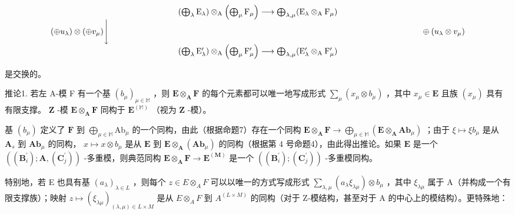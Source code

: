 \[
\begin{array}{c} \left(\bigoplus_ {\lambda} \mathrm{E} _ {\lambda}\right) \otimes_ {\mathrm{A}} \left(\bigoplus_ {\mu} \mathrm{F} _ {\mu}\right) \longrightarrow \bigoplus_ {\lambda , \mu} (\mathrm{E} _ {\lambda} \otimes_ {\mathrm{A}} \mathrm{F} _ {\mu}) \\ (\oplus u _ {\lambda}) \otimes (\oplus v _ {\mu}) \Bigg \downarrow \qquad \qquad \qquad \qquad \qquad \qquad \qquad \qquad \qquad \qquad \qquad \qquad \qquad \qquad \qquad \qquad \qquad \qquad \qquad \oplus (u _ {\lambda} \otimes v _ {\mu}) \\ \left(\bigoplus_ {\lambda} \mathrm{E} _ {\lambda} ^ {\prime}\right) \otimes_ {\mathrm{A}} \left(\bigoplus_ {\mu} \mathrm{F} _ {\mu} ^ {\prime}\right) \longrightarrow \bigoplus_ {\lambda , \mu} (\mathrm{E} _ {\lambda} ^ {\prime} \otimes_ {\mathrm{A}} \mathrm{F} _ {\mu} ^ {\prime}) \end{array}
\]

是交换的。

推论1. 若左 A-模 F 有一个基 \((b_{\mu})_{\mu \in \mathbb{M}}\) ，则 \(\mathbf{E} \otimes_{\mathbf{A}} \mathbf{F}\) 的每个元素都可以唯一地写成形式 \(\sum_{\mu} (x_{\mu} \otimes b_{\mu})\) ，其中 \(x_{\mu} \in \mathbf{E}\) 且族 \((x_{\mu})\) 具有有限支撑。 \(\mathbf{Z}\) -模 \(\mathbf{E} \otimes_{\mathbf{A}} \mathbf{F}\) 同构于 \(\mathbf{E}^{(\mathbb{M})}\) （视为 \(\mathbf{Z}\) -模）。

基 \((b_{\mu})\) 定义了 \(\mathbf{F}\) 到 \(\bigoplus_{\mu \in \mathbb{M}}\mathrm{Ab}_{\mu}\) 的一个同构，由此（根据命题7）存在一个同构 \(\mathbf{E} \otimes_{\mathbf{A}}\mathbf{F} \to \bigoplus_{\mu \in \mathbb{M}}(\mathbf{E} \otimes_{\mathbf{A}}\mathbf{Ab}_{\mu})\) ；由于 \(\xi \mapsto \xi b_{\mu}\) 是从 \(\mathbf{A}_s\) 到 \(\mathbf{Ab}_{\mu}\) 的同构， \(x \mapsto x \otimes b_{\mu}\) 是从 \(\mathbf{E}\) 到 \(\mathbf{E} \otimes_{\mathbf{A}} (\mathbf{Ab}_{\mu})\) 的同构（根据第 4 号命题4），由此得出推论。如果 \(\mathbf{E}\) 是一个 \(((\mathbf{B}_i^{\prime}); \mathbf{A}, (\mathbf{C}_j^{\prime}))\) -多重模，则典范同构 \(\mathbf{E} \otimes_{\mathbf{A}} \mathbf{F} \to \mathbf{E}^{(\mathbf{M})}\) 是一个 \(((\mathbf{B}_i^{\prime}); (\mathbf{C}_j^{\prime}))\) -多重模同构。

特别地，若 E 也具有基 \((a_{\lambda})_{\lambda \in L}\) ，则每个 \(z \in E \otimes_{A} F\) 可以以唯一的方式写成形式 \(\sum_{\lambda, \mu} (a_{\lambda} \xi_{\lambda \mu}) \otimes b_{\mu}\) ，其中 \(\xi_{\lambda \mu}\) 属于 A（并构成一个有限支撑族）；映射 \(z \mapsto (\xi_{\lambda \mu})_{(\lambda, \mu) \in L \times M}\) 是从 \(E \otimes_{A} F\) 到 \(A^{(L \times M)}\) 的同构（对于 Z-模结构，甚至对于 A 的中心上的模结构）。更特殊地：

